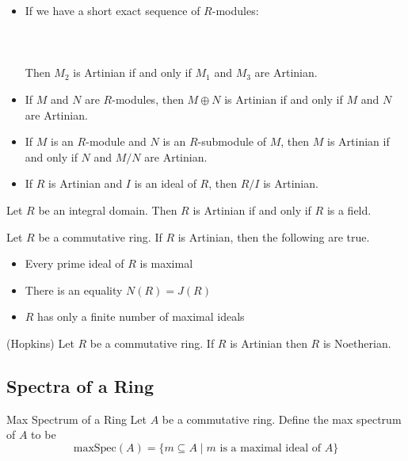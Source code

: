 \documentclass[a4paper]{article}
\begin{document}
\begin{itemize}
\item If we have a short exact sequence of $R$-modules: \\~\\
\\~\\
Then $M_2$ is Artinian if and only if $M_1$ and $M_3$ are Artinian. 
\item If $M$ and $N$ are $R$-modules, then $M\oplus N$ is Artinian if and only if $M$ and $N$ are Artinian. 
\item If $M$ is an $R$-module and $N$ is an $R$-submodule of $M$, then $M$ is Artinian if and only if $N$ and $M/N$ are Artinian.
\item If $R$ is Artinian and $I$ is an ideal of $R$, then $R/I$ is Artinian. 
\end{itemize}

\begin{prp}{}{} Let $R$ be an integral domain. Then $R$ is Artinian if and only if $R$ is a field. 
\end{prp}

\begin{prp}{}{} Let $R$ be a commutative ring. If $R$ is Artinian, then the following are true. 
\begin{itemize}
\item Every prime ideal of $R$ is maximal
\item There is an equality $N(R)=J(R)$
\item $R$ has only a finite number of maximal ideals
\end{itemize}
\end{prp}

\begin{thm}{(Hopkins)}{} Let $R$ be a commutative ring. If $R$ is Artinian then $R$ is Noetherian. 
\end{thm}

\subsection{Spectra of a Ring}
\begin{defn}{Max Spectrum of a Ring}{} Let $A$ be a commutative ring. Define the max spectrum of $A$ to be $$\text{maxSpec}(A)=\{m\subseteq A\;|\;m\text{ is a maximal ideal of }A\}$$
\end{defn}
\end{document}
